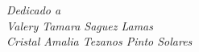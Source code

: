 \chapter*{}
\begin{flushright}
\textit{Dedicado a \\
    Valery Tamara Saguez Lamas \\
    Cristal Amalia Tezanos Pinto Solares}
    \end{flushright}
\newpage

